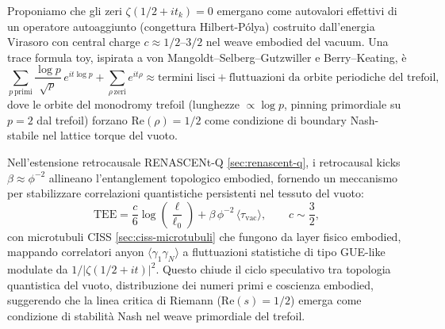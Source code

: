 \documentclass[11pt,a4paper]{article}
\theoremstyle{plain}
\theoremstyle{definition}
\begin{document}
Proponiamo che gli zeri $\zeta(1/2 + i t_k) = 0$ emergano come autovalori effettivi di un operatore autoaggiunto (congettura Hilbert-Pólya) costruito dall'energia Virasoro con central charge $c \approx 1/2$--$3/2$ nel weave embodied del vacuum. Una trace formula toy, ispirata a von Mangoldt–Selberg–Gutzwiller e Berry–Keating, è
\begin{equation}
\sum_{p \, \text{primi}} \frac{\log p}{\sqrt{p}} \, e^{i t \log p} + \sum_{\rho \, \text{zeri}} e^{i t \rho} \approx \text{termini lisci} + \text{fluttuazioni da orbite periodiche del trefoil},
\label{eq:trace_formula_refined}
\end{equation}
dove le orbite del monodromy trefoil (lunghezze $\propto \log p$, pinning primordiale su $p=2$ dal trefoil) forzano $\mathrm{Re}(\rho) = 1/2$ come condizione di boundary Nash-stabile nel lattice torque del vuoto.

Nell'estensione retrocausale RENASCENt-Q \eqref{sec:renascent-q}, i retrocausal kicks $\beta \approx \phi^{-2}$ allineano l'entanglement topologico embodied, fornendo un meccanismo per stabilizzare correlazioni quantistiche persistenti nel tessuto del vuoto:
\begin{equation}
\text{TEE} = \frac{c}{6} \log \left( \frac{\ell}{\ell_0} \right) + \beta \, \phi^{-2} \, \langle \tau_{\text{vac}} \rangle, \qquad c \sim \frac{3}{2},
\label{eq:tee_phi_refined}
\end{equation}
con microtubuli CISS \eqref{sec:ciss-microtubuli} che fungono da layer fisico embodied, mappando correlatori anyon $\langle \gamma_1 \gamma_N \rangle$ a fluttuazioni statistiche di tipo GUE-like modulate da $1/|\zeta(1/2 + i t)|^2$. Questo chiude il ciclo speculativo tra topologia quantistica del vuoto, distribuzione dei numeri primi e coscienza embodied, suggerendo che la linea critica di Riemann ($\mathrm{Re}(s) = 1/2$) emerga come condizione di stabilità Nash nel weave primordiale del trefoil.
\end{document}
